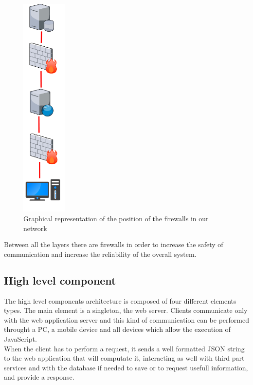 \documentclass[numbers=noenddot, 12pt, a4paper, oneside]{scrbook}
\begin{document}
\begin{figure}[H]
	\centering
	\includegraphics[width=0.2\textwidth]{images/ArchitectureLayer}
	\caption{Graphical representation of the position of the firewalls in our network}
\end{figure}

Between all the layers there are firewalls in order to increase the safety of communication and increase the reliability of the overall system.

\subsection*{High level component}

The high level components architecture is composed of four different elements
types. The main element is a singleton, the web server.
Clients communicate only with the web application server and this kind of communication can be performed throught a PC, a mobile device and all devices which allow the execution of JavaScript.\\

When the client has to perform a request, it sends a well formatted JSON string to the web application that will computate it, interacting as well with third part services and with the database if needed to save or to request usefull information, and provide a response.\\
\end{document}

